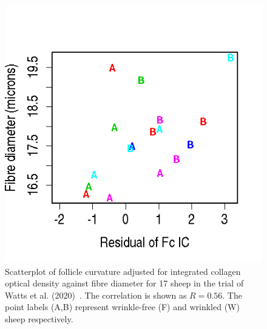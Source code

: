 %

\begin{figure}[]
\centering
    \includegraphics[scale=0.80]{fcadjcxd.png}
  \caption{Scatterplot of follicle curvature adjusted for integrated collagen optical density against fibre diameter for 17 sheep in the trial of Watts et al. (2020)~\cite{watts-2020}. The correlation is shown as $R=0.56$. The point labels (A,B) represent wrinkle-free (F) and wrinkled (W) sheep respectively. }
\vfill
  \label{fig:fcadjcxd}
\end{figure}

%

